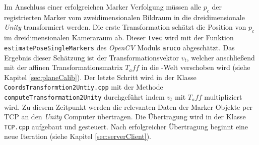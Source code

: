 Im Anschluss einer erfolgreichen Marker Verfolgung müssen alle $p_c$ der registrierten Marker vom zweidimensionalen Bildraum in die dreidimensionale \textit{Unity} transformiert werden. Die erste Transformation schätzt die Position von $p_c$ im dreidimensionalen Kameraraum ab. Dieser \texttt{tvec} wird mit der Funktion \texttt{estimatePoseSingleMarkers} des \textit{OpenCV} Moduls \texttt{aruco} abgeschätzt.
Das Ergebnis dieser Schätzung ist der Transformationsvektor $v_t$, welcher anschließend mit der affinen Transformationsmatrix $T_aff$ in die -Welt verschoben wird (siehe Kapitel \ref{sec:planeCalib}). Der letzte Schritt wird in der Klasse \texttt{CoordsTransformtion2Untiy.cpp} mit der Methode \texttt{computeTransformation2Unity} durchgeführt indem $v_t$ mit $T_aff$ multipliziert wird. Zu diesem Zeitpunkt werden die relevanten Daten der Marker Objekte per TCP an den \textit{Unity} Computer übertragen. Die Übertragung wird in der Klasse \texttt{TCP.cpp} aufgebaut und gesteuert. Nach erfolgreicher Übertragung beginnt eine neue Iteration (siehe Kapitel \ref{sec:serverClient}).

\newpage